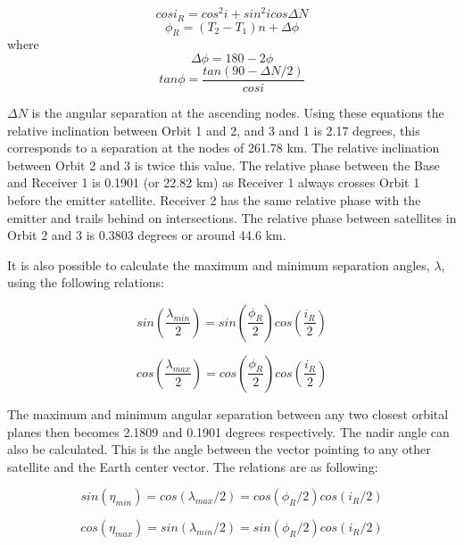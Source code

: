 \begin{equation}
cos i_R = cos^2i+sin^2i cos \Delta N
\label{ir}
\end{equation}
\begin{equation}
\phi_R = (T_2-T_1)n+ \Delta \phi
\label{phir}
\end{equation}
where
\begin{equation}
\Delta \phi = 180 - 2 \phi
\label{deltaPhi}
\end{equation}
\begin{equation}
tan \phi = \frac{tan ( 90 - \Delta N / 2)}{cos i}
\label{tanphi}
\end{equation}

$\Delta N$ is the angular separation at the ascending nodes. Using these equations the relative inclination between Orbit 1 and 2, and 3 and 1 is 2.17 degrees, this corresponds to a separation at the nodes of 261.78 km. The relative inclination between Orbit 2 and 3 is twice this value. The relative phase between the Base and Receiver 1 is 0.1901 (or 22.82 km) as Receiver 1 always crosses Orbit 1 before the emitter satellite. Receiver 2 has the same relative phase with the emitter and trails behind on intersections. The relative phase between satellites in Orbit 2 and 3 is 0.3803 degrees or around 44.6 km.

It is also possible to calculate the maximum and minimum separation angles, $\lambda$, using the following relations:

\begin{equation}
sin ( \frac{\lambda_{min}}{2} ) = sin ( \frac{ \phi_R }{2} ) cos ( \frac{i_R}{2} )
\label{lambdamin}
\end{equation}

\begin{equation}
cos ( \frac{\lambda_{max}}{2} ) = cos ( \frac{ \phi_R }{2} ) cos ( \frac{i_R}{2} )
\label{lambdamax}
\end{equation}

The maximum and minimum angular separation between any two closest orbital planes then becomes 2.1809 and 0.1901 degrees respectively. The nadir angle can also be calculated. This is the angle between the vector pointing to any other satellite and the Earth center vector. The relations are as following:

\begin{equation}
sin (\eta_{min} ) = cos(\lambda _{max}/2) = cos(\phi _R/2)cos(i_R/2)
\end{equation}

\begin{equation}
cos(\eta_{max} ) = sin(\lambda _{min}/2) = sin(\phi _R/2)cos(i_R/2)
\end{equation}

